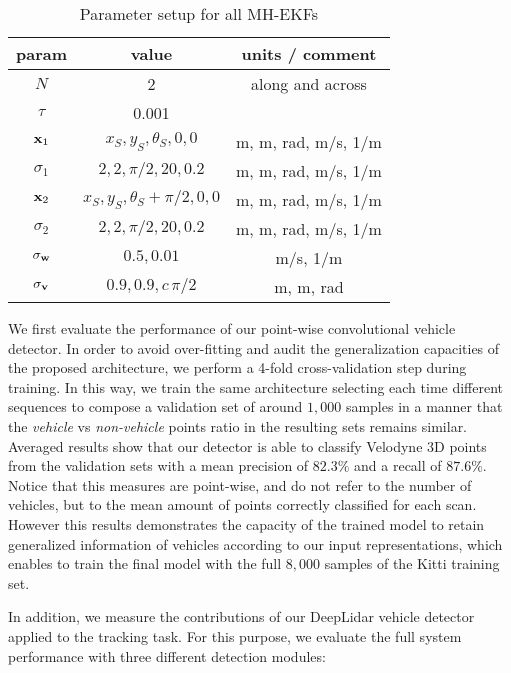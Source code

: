 \documentclass[letterpaper, 10 pt, conference]{ieeeconf}  %
\begin{document}
\begin{table}[tb]
\centering
\caption{Parameter setup for all MH-EKFs}
\label{tab:MHEKF}
\begin{tabular}{c|c|c|}
param & value & units / comment \\
\hline
\hline
$N$ & 2 & along and across\\
$\tau$ & 0.001 &\\
\hline
${\bf x}_1$ & $x_S, y_S, \theta_S, 0, 0$ & m, m, rad, m/s, 1/m\\
$\sigma_1$ & $2, 2, \pi/2, 20, 0.2$ & m, m, rad, m/s, 1/m\\
${\bf x}_2$ & $x_S, y_S, \theta_S + \pi/2, 0, 0$& m, m, rad, m/s, 1/m\\
$\sigma_2$ & $2, 2, \pi/2, 20, 0.2$ & m, m, rad, m/s, 1/m\\
\hline
$\sigma_{\bf w}$ & $ 0.5, 0.01$ & m/s, 1/m \\
$\sigma_{\bf v}$ & $0.9, 0.9, c\,\pi/2 $ &  m, m, rad \\
\hline
\end{tabular}
\end{table}%
We first evaluate the performance of our point-wise convolutional vehicle detector. 
In order to avoid over-fitting and audit the generalization capacities of the proposed architecture, we perform a 4-fold cross-validation step during training. In this way, we train the same architecture selecting each time different sequences to compose a validation set of around $1,000$ samples in a manner that the \textit{vehicle} vs \textit{non-vehicle} points ratio in the resulting sets remains similar.
Averaged results show that our detector is able to classify Velodyne 3D points from the validation sets with a mean precision of $82.3\%$ and a recall of $87.6\%$. 
Notice that this measures are point-wise, and do not refer to the number of vehicles, but to the mean amount of points correctly classified for each scan. However this results demonstrates the capacity of the trained model to retain generalized information of vehicles according to our input representations, which enables to train the final model with the full $8,000$ samples of the Kitti training set.

In addition, we measure the contributions of our DeepLidar vehicle detector applied to the tracking task. For this purpose, we evaluate the full system performance with three different detection modules:
\end{document}
